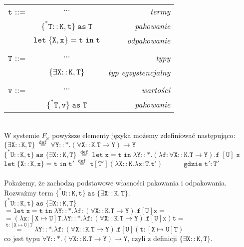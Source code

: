 \documentclass[11pt,leqno]{article}
\begin{document}
\begin{tabular}{| l c r |}
  \hline
  $\mathtt{t}$ ::= & $\cdots$ & \textit{termy}  \\
   & $\mathtt{\{^*T::K,t\}\;as\;T}$ & \textit{pakowanie} \\
   & $\mathtt{let\;\{X,x\}=t\;in\;t}$ & \textit{odpakowanie} \\
   & & \\
  $\mathtt{T}$ ::= & $\cdots$ & \textit{typy}  \\
   & $\mathtt{\{\exists X::K,T\}}$ & \textit{typ egzystencjalny} \\
   & & \\
  $\mathtt{v}$ ::= & $\cdots$ & \textit{wartości}  \\
   & $\mathtt{\{^*T,v\}\;as\;T}$ & \textit{pakowanie} \\
  \hline
\end{tabular} \\

W systemie $F_\omega$ powyższe elementy języka możemy zdefiniować następująco: \\
$\mathtt{\{\exists X::K,T\}\;\overset{def}{=}\;\forall Y::\ast.(\forall X::K.T \rightarrow Y) \rightarrow Y}$ \\
$\mathtt{\{^*U::K,t\}\;as\; \{\exists X::K,T\}\; \overset{def}{=} \;let\;x=t\;in\;\lambda Y::\ast.(\lambda f:\forall X::K.T \rightarrow Y) .f\;[U]\;x}$ \\
$\mathtt{let\;\{X::K,x\}=t\;in\;t'\;\overset{def}{=}\;t[T'](\lambda X::K.\lambda x:T.t')\hspace{3em} \text{gdzie $\mathtt{t':T'}$} }$ \\ \\

Pokażemy, że zachodzą podstawowe własności pakowania i odpakowania. \\
Rozważmy term $\mathtt{ \{^*U::K,t\}\;as\; \{\exists X::K,T\}}$. \\ 
$ \mathtt{ \{^*U::K,t\}\;as\; \{\exists X::K,T\} }$ \\ 
$ \mathtt{ = let\;x=t\;in\;\lambda Y::\ast.\lambda f:(\forall X::K.T \rightarrow Y).f[U]x = }$ \\
$ \mathtt{ = (\lambda x:[X \mapsto U]T.\lambda Y::\ast.\lambda f:(\forall X::K.T \rightarrow Y).f[U]x)t = }$ \\
$ \mathtt{ \overset{t:[X \mapsto U]T}{=} \lambda Y::\ast.\lambda f:(\forall X::K.T \rightarrow Y).f[U](t:[X \mapsto U]T)}$ \\
co jest typu $\mathtt{\forall Y::\ast.(\forall X::K.T \rightarrow Y) \rightarrow Y}$, czyli z definicji $\mathtt{\{\exists X::K,T\}}$. \\
\end{document}
